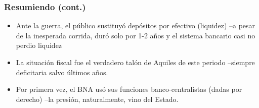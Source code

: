 \documentclass[14pt,aspectratio=169]{beamer}
\begin{document}
 \begin{frame}\frametitle{Resumiendo (cont.)}
    \begin{itemize}\itemsep 10pt
    \item Ante la guerra, el público sustituyó depósitos por efectivo
      (liquidez) --a pesar de la inesperada corrida, duró solo por 1-2
      años y el sistema bancario casi no perdio liquidez
      \item La situación fiscal fue el verdadero talón de Aquiles de
        este periodo --siempre deficitaria salvo últimos años.
        \item Por primera vez, el BNA usó sus funciones
          banco-centralistas (dadas por derecho) --la presión,
          naturalmente, vino del Estado.
                
      \end{itemize}
      \end{frame}
      
  
\end{document}
